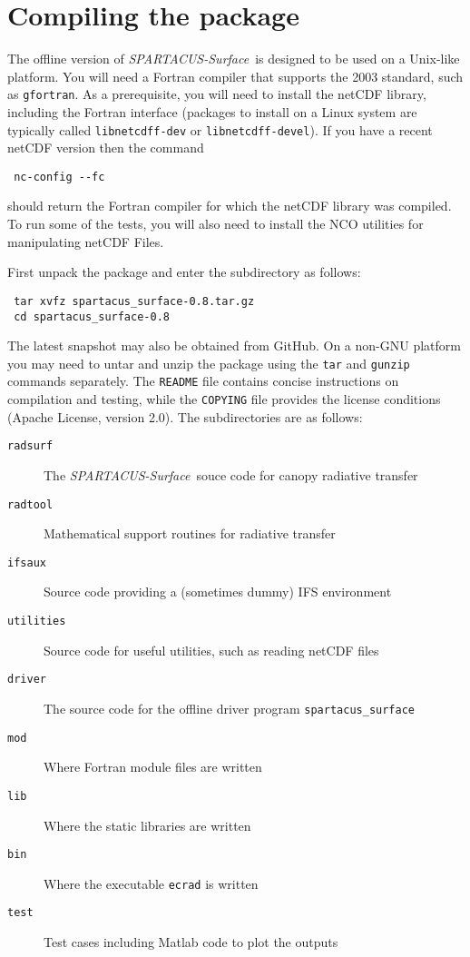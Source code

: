 \documentclass[a4,oneside]{article}
\def\codesize{\small}
\def\spsurf{\emph{SPARTACUS-Surface}}
\def\code#1{{\codesize\texttt{#1}}}
\def\citem#1{\item[{\codesize\texttt{#1}}]}
\def\chapter{\section}
\begin{document}

\section{Compiling the package}
The offline version of \spsurf\ is designed to be used on a Unix-like
platform. You will need a Fortran compiler that supports the 2003
standard, such as \code{gfortran}.
%
As a prerequisite, you will need to install the netCDF library,
including the Fortran interface (packages to install on a Linux system
are typically called \code{libnetcdff-dev} or
\code{libnetcdff-devel}).  If you have a recent netCDF version then
the command
\begin{lstlisting}
 nc-config --fc
\end{lstlisting}
should return the Fortran compiler for which the netCDF library was
compiled.  To run some of the tests, you will also need to install the
NCO utilities for manipulating netCDF Files.

First unpack the package and enter the subdirectory as follows:
\begin{lstlisting}
 tar xvfz spartacus_surface-0.8.tar.gz
 cd spartacus_surface-0.8
\end{lstlisting}
The latest snapshot may also be obtained from GitHub.  On a non-GNU
platform you may need to untar and unzip the package using the
\code{tar} and \code{gunzip} commands separately. The \code{README}
file contains concise instructions on compilation and testing, while
the \code{COPYING} file provides the license conditions (Apache
License, version 2.0). The subdirectories are as follows:
%
\begin{description}
\citem{radsurf} The \spsurf\ souce code for canopy radiative transfer
\citem{radtool} Mathematical support routines for radiative transfer
\citem{ifsaux} Source code providing a (sometimes dummy) IFS environment
\citem{utilities} Source code for useful utilities, such as reading netCDF
       files
\citem{driver} The source code for the offline driver program \code{spartacus\_surface}
\citem{mod} Where Fortran module files are written
\citem{lib} Where the static libraries are written
\citem{bin} Where the executable \code{ecrad} is written
\citem{test} Test cases including Matlab code to plot the outputs
\end{description}
\end{document}
